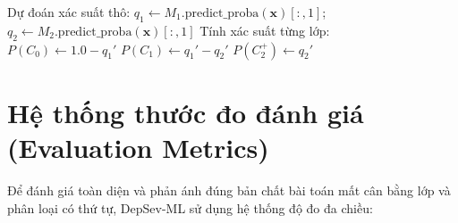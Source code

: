 \begin{algorithm}[h!]
\SetAlgoLined
{}
Dự đoán xác suất thô: $q_1 \leftarrow M_1.\text{predict\_proba}(\mathbf{x})[:, 1]$; \quad $q_2 \leftarrow M_2.\text{predict\_proba}(\mathbf{x})[:, 1]$\;
Tính xác suất từng lớp:\\
$P(C_0) \leftarrow 1.0 - q_1'$\;
$P(C_1) \leftarrow q_1' - q_2'$\;
$P(C_2^+) \leftarrow q_2'$\;
\Return{$[P(C_0), P(C_1), P(C_2^+)]$}\;
\caption{Quy trình suy diễn Frank \& Hall với phép chiếu đẳng điệu ($E_7b$)}
\label{algo:frank-hall}
\end{algorithm}

\section{Hệ thống thước đo đánh giá (Evaluation Metrics)}
\label{sec:he-thong-thuoc-do}

Để đánh giá toàn diện và phản ánh đúng bản chất bài toán mất cân bằng lớp và phân loại có thứ tự, DepSev-ML sử dụng hệ thống độ đo đa chiều:

